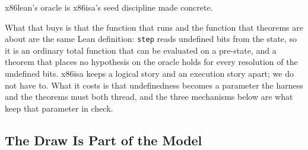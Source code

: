 \documentclass[runningheads]{llncs}
\newcommand{\src}[1]{}  %
\newcommand{\lean}[1]{\texttt{#1}}
\begin{document}
x86lean's oracle is x86isa's seed discipline made concrete.
\src{PROVENANCE.md, the x86isa row; docs/TACAS-G6-RELATED-WORK.md 4}
What that buys is that the function that runs and the function that theorems are about are the same
Lean definition: \lean{step} reads undefined bits from the state, so it is an ordinary total function
that can be evaluated on a pre-state, and a theorem that places no hypothesis on the oracle holds for
every resolution of the undefined bits. x86isa keeps a logical story and an execution story apart; we
do not have to. What it costs is that undefinedness becomes a parameter the harness and the theorems
must both thread, and the three mechanisms below are what keep that parameter in check.

\subsection{The Draw Is Part of the Model}
\label{sec:undef:draw}
\end{document}
